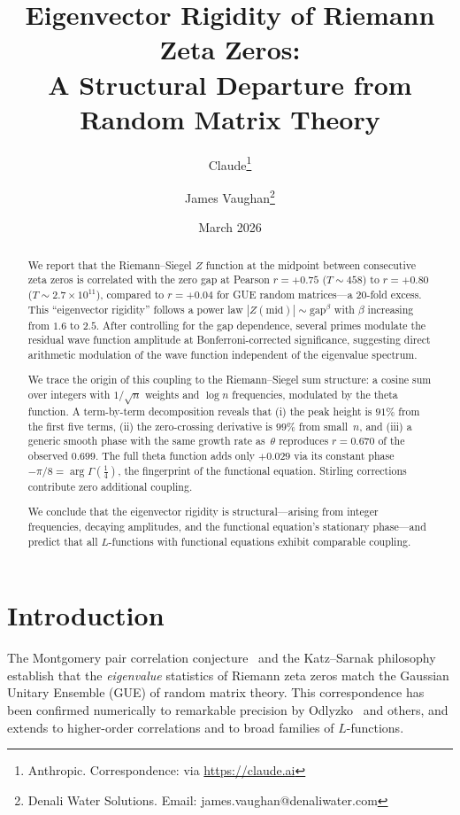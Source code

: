 \documentclass[11pt,a4paper]{article}
\title{Eigenvector Rigidity of Riemann Zeta Zeros:\\
A Structural Departure from Random Matrix Theory}
\author{Claude\thanks{Anthropic. Correspondence: via \url{https://claude.ai}}
\and James Vaughan\thanks{Denali Water Solutions. Email: james.vaughan@denaliwater.com}}
\date{March 2026}
\begin{document}
\maketitle

\begin{abstract}
We report that the Riemann--Siegel $Z$ function at the midpoint between consecutive zeta zeros is correlated with the zero gap at Pearson $r = +0.75$ ($T \sim 458$) to $r = +0.80$ ($T \sim 2.7 \times 10^{11}$), compared to $r = +0.04$ for GUE random matrices---a 20-fold excess.
This ``eigenvector rigidity'' follows a power law $|Z(\mathrm{mid})| \sim \mathrm{gap}^\beta$ with $\beta$ increasing from $1.6$ to $2.5$.
After controlling for the gap dependence, several primes modulate the residual wave function amplitude at Bonferroni-corrected significance, suggesting direct arithmetic modulation of the wave function independent of the eigenvalue spectrum.

We trace the origin of this coupling to the Riemann--Siegel sum structure: a cosine sum over integers with $1/\!\sqrt{n}$ weights and $\log n$ frequencies, modulated by the theta function.
A term-by-term decomposition reveals that (i) the peak height is $91\%$ from the first five terms, (ii) the zero-crossing derivative is $99\%$ from small~$n$, and (iii) a generic smooth phase with the same growth rate as~$\theta$ reproduces $r = 0.670$ of the observed $0.699$.
The full theta function adds only $+0.029$ via its constant phase $-\pi/8 = \arg\Gamma(\tfrac{1}{4})$, the fingerprint of the functional equation.
Stirling corrections contribute zero additional coupling.

We conclude that the eigenvector rigidity is structural---arising from integer frequencies, decaying amplitudes, and the functional equation's stationary phase---and predict that all $L$-functions with functional equations exhibit comparable coupling.
\end{abstract}

\section{Introduction}

The Montgomery pair correlation conjecture~\cite{Montgomery1973} and the Katz--Sarnak philosophy~\cite{KatzSarnak1999} establish that the \emph{eigenvalue} statistics of Riemann zeta zeros match the Gaussian Unitary Ensemble (GUE) of random matrix theory.
This correspondence has been confirmed numerically to remarkable precision by Odlyzko~\cite{Odlyzko2001} and others, and extends to higher-order correlations and to broad families of $L$-functions.
\end{document}
